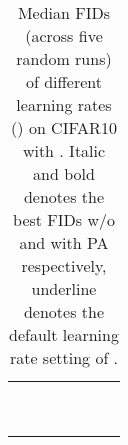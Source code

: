 \documentclass{article}
\begin{document}
\begin{center}
\begin{table}[t!]
\setlength{\tabcolsep}{0.22em} 
	\renewcommand{\arraystretch}{1.1}
\centering
	\caption{Median FIDs (across five random runs) of different learning rates () on CIFAR10 with .
		Italic and bold denotes the best FIDs w/o and with PA respectively, underline denotes the default learning rate setting of .} \label{table:ttur} \vspace{0.5em}
	\begin{tabular}{c|c|cccc|c} 
		\rowcolor{verylightgray}
		\text{\backslashbox{}{}} & \footnotesize{}{\text{}} &  \footnotesize{}{ \text{\footnotesize}} & \footnotesize{}{ \text{\footnotesize}} & \footnotesize{}{ \text{\footnotesize}} & \footnotesize{}{ \text{\footnotesize}}  & \footnotesize{}{\text{}}\tabularnewline 
		
		\multirow{2}{*}{\text{\footnotesize}} &\footnotesize{}{\xmark} &\text{\footnotesize} & \text{\footnotesize}  & \text{\footnotesize} & \text{\footnotesize} & \multirow{2}{*}{\text{\footnotesize}}\tabularnewline 	
		&\footnotesize{}{\cmark} & \text{\footnotesize} & \text{\footnotesize} & \text{\footnotesize}& \text{\footnotesize} & \tabularnewline 
		\arrayrulecolor{gray}	\hline \arrayrulecolor{verylightgray}
		
		\multirow{2}{*}{\text{\footnotesize}} &\footnotesize{}{\xmark} &\text{\footnotesize} & \text{\footnotesize\underline{}}  & \text{\footnotesize} & \text{\footnotesize} & \multirow{2}{*}{\text{\footnotesize}} \tabularnewline 	
		&\footnotesize{}{\cmark} & \text{\footnotesize} & \text{\footnotesize\underline{}} & \text{\footnotesize}& \text{\footnotesize}& \tabularnewline 
		\arrayrulecolor{gray}	\hline \arrayrulecolor{verylightgray}
		
		\multirow{2}{*}{\text{\footnotesize}} &\footnotesize{}{\xmark} &\text{\footnotesize} & \text{\footnotesize}  & \text{\footnotesize} & \text{\footnotesize}& \multirow{2}{*}{\text{\footnotesize}}\tabularnewline 	
		&\footnotesize{}{\cmark} & \text{\footnotesize} & \text{\footnotesize} & \text{\footnotesize}& \text{\footnotesize}& \tabularnewline 
		\arrayrulecolor{gray}	\hline \arrayrulecolor{verylightgray}
		
		\multirow{2}{*}{\text{\footnotesize}} &\footnotesize{}{\xmark} &\text{\footnotesize} & \text{\footnotesize}  & \text{\footnotesize} & \text{\footnotesize} &  \multirow{2}{*}{\text{\footnotesize}} \tabularnewline 	
		&\footnotesize{}{\cmark} & \text{\footnotesize} & \text{\footnotesize} & \text{\footnotesize}& \text{\footnotesize}& \end{tabular}	
	\vspace{-0.7em}
\end{table}




\end{center}
\end{document}

